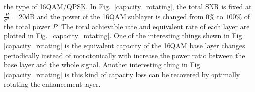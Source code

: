 \documentclass[10pt,fleqn, twocolumn]{IEEEtran}
\begin{document}
the type of 16QAM/QPSK. In Fig.~\ref{capacity_rotating}, the total
SNR is fixed at $\frac{P}{\sigma^2}=20\mbox{dB}$ and the power of
the 16QAM sublayer is changed from $0\%$ to $100\%$ of the total
power $P$. The total achievable rate and equivalent rate of each
layer are plotted in Fig.~\ref{capacity_rotating}. One of the
interesting things shown in Fig. \ref{capacity_rotating} is the
equivalent capacity of the 16QAM base layer changes periodically
instead of monotonically with increase the power ratio between the
base layer and the whole signal. Another interesting thing in Fig.
\ref{capacity_rotating} is this kind of capacity loss can be
recovered by optimally rotating the enhancement layer.
\begin{figure}
\end{figure}
\end{document}
